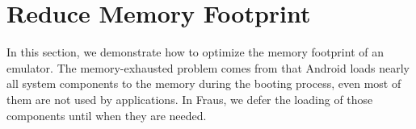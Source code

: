 \documentclass[conference]{IEEEtranl}
\begin{document}



	\section{Reduce Memory Footprint}\label{memory}

	In this section, we demonstrate how to optimize the memory footprint of an emulator. The memory-exhausted problem comes from that Android loads nearly all system components to the memory during the booting process, even most of them are not used by applications. In Fraus, we defer the loading of those components until when they are needed. 
\end{document}
